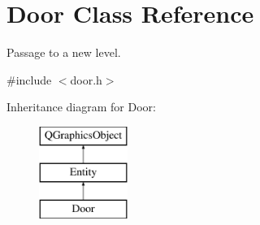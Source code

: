 \hypertarget{class_door}{}\section{Door Class Reference}
\label{class_door}


Passage to a new level.  




{\ttfamily \#include $<$door.\+h$>$}

Inheritance diagram for Door\+:\begin{figure}[H]
\begin{center}
\leavevmode
\includegraphics[height=3.000000cm]{class_door}
\end{center}
\end{figure}
